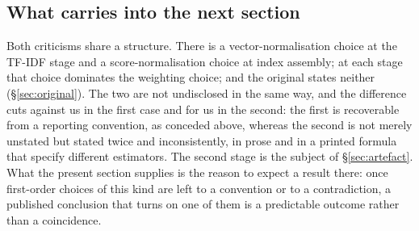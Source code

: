 \subsection{What carries into the next section}

Both criticisms share a structure. There is a vector-normalisation choice at the TF-IDF stage
and a score-normalisation choice at index assembly; at each stage that choice dominates the
weighting choice; and the original states neither (\S\ref{sec:original}). The two are not
undisclosed in the same way, and the difference cuts against us in the first case and for us
in the second: the first is recoverable from a reporting convention, as conceded above,
whereas the second is not merely unstated but stated twice and inconsistently, in prose and
in a printed formula that specify different estimators. The second stage is the subject of
\S\ref{sec:artefact}. What the present section supplies is the reason to expect a result
there: once first-order choices of this kind are left to a convention or to a contradiction,
a published conclusion that turns on one of them is a predictable outcome rather than a
coincidence.
